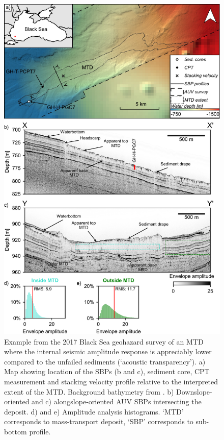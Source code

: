 \documentclass[se,manuscript]{copernicus}
\begin{document}
\begin{figure}
        \includegraphics{figures/fig01.pdf}
        \caption{Example from the 2017 Black Sea geohazard survey of an MTD where the internal seismic amplitude response is appreciably lower compared to the unfailed sediments (`acoustic transparency').
        a) Map showing location of the SBPs (b and c), sediment core, CPT measurement and stacking velocity profile relative to the interpreted extent of the MTD. Background bathymetry from \cite{gebco2021}.
        b) Downslope-oriented and c) alongslope-oriented AUV SBPs intersecting the deposit.
        d) and e) Amplitude analysis histograms.
        `MTD' corresponds to mass-transport deposit, `SBP' corresponds to sub-bottom profile.}
        \label{fig:black-sea-example}
\end{figure}
\end{document}
